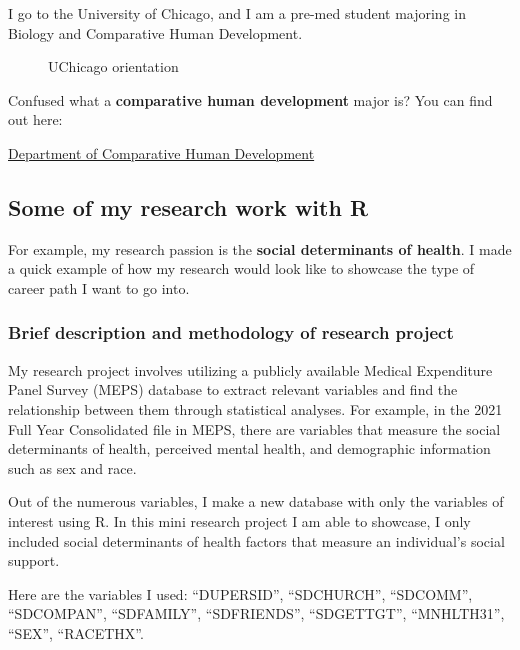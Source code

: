 \documentclass[
]{apa7}
\makeatletter
\newcommand*\pandocbounded[1]{%
  \sbox\pandoc@box{#1}%
  \Gscale@div\@tempa{\textheight}{\dimexpr\ht\pandoc@box+\dp\pandoc@box\relax}%
  \Gscale@div\@tempb{\linewidth}{\wd\pandoc@box}%
  \ifdim\@tempb\p@<\@tempa\p@\let\@tempa\@tempb\fi%
  \ifdim\@tempa\p@<\p@\scalebox{\@tempa}{\usebox\pandoc@box}%
  \else\usebox{\pandoc@box}%
  \fi%
}
\makeatother
\begin{document}
I go to the University of Chicago, and I am a pre-med student majoring
in Biology and Comparative Human Development.

\begin{figure}[H]

{\centering \pandocbounded{\texttt{[image: images/uchicago-walk.jpeg]}}

}

\caption{UChicago orientation}

\end{figure}%

Confused what a \textbf{comparative human development} major is? You can
find out here:

\href{https://humdev.uchicago.edu/}{Department of Comparative Human
Development}

\subsection{Some of my research work with
R}\label{some-of-my-research-work-with-r}

For example, my research passion is the \textbf{social determinants of
health}. I made a quick example of how my research would look like to
showcase the type of career path I want to go into.

\subsubsection{Brief description and methodology of research
project}\label{brief-description-and-methodology-of-research-project}

My research project involves utilizing a publicly available Medical
Expenditure Panel Survey (MEPS) database to extract relevant variables
and find the relationship between them through statistical analyses. For
example, in the 2021 Full Year Consolidated file in MEPS, there are
variables that measure the social determinants of health, perceived
mental health, and demographic information such as sex and race.

Out of the numerous variables, I make a new database with only the
variables of interest using R. In this mini research project I am able
to showcase, I only included social determinants of health factors that
measure an individual's social support.

Here are the variables I used: ``DUPERSID'', ``SDCHURCH'', ``SDCOMM'',
``SDCOMPAN'', ``SDFAMILY'', ``SDFRIENDS'', ``SDGETTGT'', ``MNHLTH31'',
``SEX'', ``RACETHX''.
\end{document}
